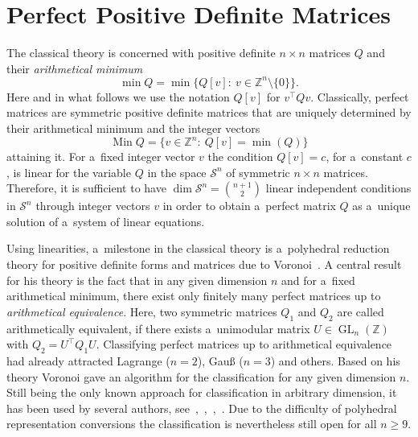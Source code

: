 \documentclass{commat}
\newcommand{\IZ}{{\mathbb{Z}}}
\newcommand{\IZn}{\IZ^n}
\newcommand{\sn}{{\mathcal{S}}^{n}}
\newcommand{\IZnmo}{\IZn\setminus\{0\}}
\DeclareMathOperator{\Min}{Min}
\newcommand{\gl}{\operatorname{GL}}
\newcommand{\glnz}{\gl_n (\IZ)}
\begin{document}
\section{Perfect Positive Definite Matrices}\label{sec:classical}

The classical theory is concerned with positive definite \(n\times n \) matrices $Q$ and their
\emph{arithmetical minimum}
\[
	\min Q=\min\big\{ Q[v] :\ v\in\IZnmo \big\}.
\]
Here and in what follows we use the notation \(Q[v] \) for \(v^\intercal Qv \).
Classically, perfect matrices are symmetric positive definite matrices that are uniquely determined
by their arithmetical minimum and the integer vectors
\[
	\Min Q=\big\{ v\in\IZn :\ Q[v]=\min(Q) \big\}
\]
attaining it.
For a~fixed integer vector $v$ the condition \(Q[v]=c \), for a~constant $c$, is linear for
the variable $Q$ in the space \(\sn \) of symmetric \(n \times n \) matrices.
Therefore, it is sufficient to have \(\dim\sn=\binom{n+1}{2} \) linear independent
conditions in \(\sn \) through integer vectors $v$ in order to obtain a~perfect matrix $Q$
as a~unique solution of a~system of linear equations.

Using linearities, a~milestone in the classical theory is a~polyhedral reduction theory for
positive definite forms and matrices due to Voronoi~\cite{voronoi-1907}.
A central result for his theory is the fact that in any given dimension $n$ and for a~fixed
arithmetical minimum, there exist only finitely many perfect matrices up to
\emph{arithmetical equivalence}.
Here, two symmetric matrices \(Q_1 \) and \(Q_2 \) are called arithmetically equivalent,
if there exists a~unimodular matrix \(U\in\glnz \) with \(Q_2=U^\intercal Q_1U \).
Classifying perfect matrices up to arithmetical equivalence had already attracted Lagrange
(\(n=2 \)), Gauß (\(n=3 \)) and others.
Based on his theory Voronoi gave an algorithm for the classification for any given dimension $n$.
Still being the only known approach for classification in arbitrary dimension, it has been used by
several authors, see~\cite{dsv-2007},~\cite{martinet-2002},~\cite{schuermann-2009a},~\cite{vanwoerden-2018}.
Due to the difficulty of polyhedral representation conversions the classification is nevertheless
still open for all \(n\geq 9 \).
\end{document}
